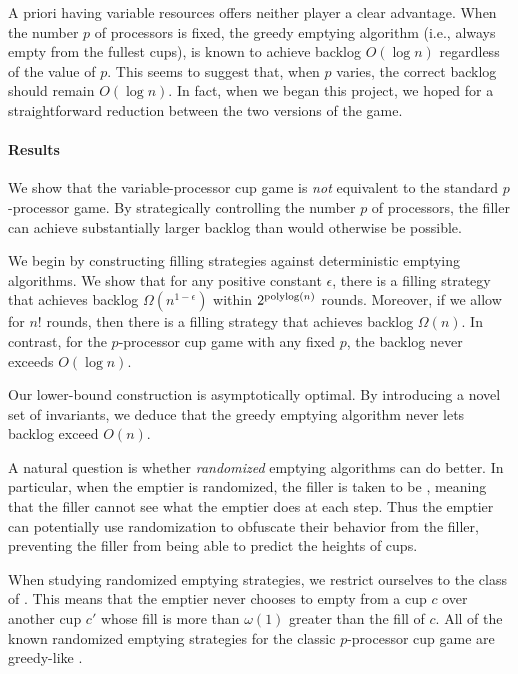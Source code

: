 A priori having variable resources offers neither player a clear
advantage. When the number $p$ of processors is fixed, the greedy
emptying algorithm (i.e., always empty from the fullest cups), is
known to achieve backlog $O(\log n)$ \cite{AdlerBeFr03,
BenderFaKu19, Kuszmaul20} regardless of the value of $p$. This
seems to suggest that, when $p$ varies, the correct backlog
should remain $O(\log n)$. In fact, when we began this project,
we hoped for a straightforward reduction between the two versions
of the game.

\paragraph{Results}
We show that the variable-processor cup game is \emph{not}
equivalent to the standard $p$-processor game. By strategically
controlling the number $p$ of processors, the filler can achieve
substantially larger backlog than would otherwise be possible.

We begin by constructing filling strategies against deterministic
emptying algorithms. We show that for any positive constant
$\epsilon$, there is a filling strategy that achieves backlog
$\Omega(n^{1 - \epsilon})$ within $2^{\operatorname{\text{polylog}}(n)}$ rounds.
Moreover, if we allow for $n!$ rounds, then there is a filling
strategy that achieves backlog $\Omega(n)$. In contrast, for the
$p$-processor cup game with any fixed $p$, the backlog never
exceeds $O(\log n)$.

Our lower-bound construction is asymptotically optimal. By
introducing a novel set of invariants, we deduce that the greedy
emptying algorithm never lets backlog exceed $O(n)$.

A natural question is whether \emph{randomized} emptying
algorithms can do better. In particular, when the emptier is
randomized, the filler is taken to be , meaning
that the filler cannot see what the emptier does at each step.
Thus the emptier can potentially use randomization to obfuscate
their behavior from the filler, preventing the filler from being
able to predict the heights of cups.

When studying randomized emptying strategies, we restrict
ourselves to the class of .
This means that the emptier never chooses to empty from a cup $c$
over another cup $c'$ whose fill is more than $\omega(1)$ greater
than the fill of $c$. All of the known randomized emptying
strategies for the classic $p$-processor cup game are greedy-like
\cite{BenderFaKu19, Kuszmaul20}.

